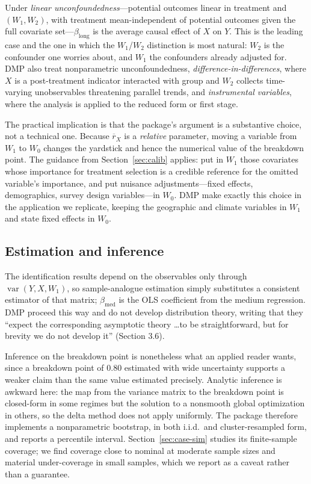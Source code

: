 \documentclass[article]{jss}\usepackage[]{graphicx}\usepackage[]{xcolor}
\newcommand{\blong}{\beta_{\mathrm{long}}}
\newcommand{\bmed}{\beta_{\mathrm{med}}}
\newcommand{\rxbar}{\ensuremath{\overline{r}_X}}
\newcommand{\Var}{\operatorname{var}}
\begin{document}
Under \emph{linear unconfoundedness}---potential outcomes linear in
treatment and $(W_1, W_2)$, with treatment mean-independent of potential
outcomes given the full covariate set---$\blong$ is the average causal
effect of $X$ on $Y$. This is the leading case and the one in which the
$W_1$/$W_2$ distinction is most natural: $W_2$ is the confounder one
worries about, and $W_1$ the confounders already adjusted for. DMP also
treat nonparametric unconfoundedness, \emph{difference-in-differences},
where $X$ is a post-treatment indicator interacted with group and $W_2$
collects time-varying unobservables threatening parallel trends, and
\emph{instrumental variables}, where the analysis is applied to the
reduced form or first stage.

The practical implication is that the package's  argument is
a substantive choice, not a technical one. Because $\rxbar$ is a
\emph{relative} parameter, moving a variable from $W_1$ to $W_0$ changes
the yardstick and hence the numerical value of the breakdown point. The
guidance from Section~\ref{sec:calib} applies: put in $W_1$ those
covariates whose importance for treatment selection is a credible
reference for the omitted variable's importance, and put nuisance
adjustments---fixed effects, demographics, survey design
variables---in $W_0$. DMP make exactly this choice in the application we
replicate, keeping the geographic and climate variables in $W_1$ and
state fixed effects in $W_0$.

\subsection{Estimation and inference}\label{sec:inference}

The identification results depend on the observables only through
$\Var(Y, X, W_1)$, so sample-analogue estimation simply substitutes a
consistent estimator of that matrix; $\bmed$ is the OLS coefficient from
the medium regression. DMP proceed this way and do not develop
distribution theory, writing that they ``expect the corresponding
asymptotic theory \ldots to be straightforward, but for brevity we do not
develop it'' (Section 3.6).

Inference on the breakdown point is nonetheless what an applied reader
wants, since a breakdown point of $0.80$ estimated with wide uncertainty
supports a weaker claim than the same value estimated precisely. Analytic
inference is awkward here: the map from the variance matrix to the
breakdown point is closed-form in some regimes but the solution to a
nonsmooth global optimization in others, so the delta method does not apply
uniformly. The package therefore implements a nonparametric bootstrap, in
both i.i.d.\ and cluster-resampled form, and reports a percentile interval.
Section~\ref{sec:case-sim} studies its finite-sample coverage; we find
coverage close to nominal at moderate sample sizes and material
under-coverage in small samples, which we report as a caveat rather than a
guarantee.
\end{document}
